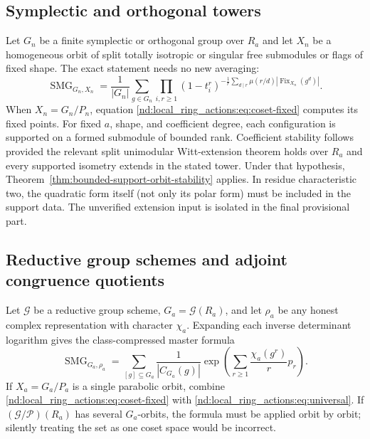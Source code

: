 \documentclass[10pt]{article}
\newcommand{\Fix}{\operatorname{Fix}}
\newcommand{\SMG}{\operatorname{SMG}}
\newcommand{\MGF}{\SMG}
\begin{document}
\clearpage
\subsection{Symplectic and orthogonal towers}
\thispagestyle{fancy}

Let $G_n$ be a finite symplectic or orthogonal group over $R_a$ and let $X_n$
be a homogeneous orbit of split totally isotropic or singular free submodules
or flags of fixed shape.  The exact statement needs no new averaging:
\begin{equation}\label{nd:local_ring_actions:eq:formed}
 \boxed{\MGF_{G_n,X_n}=\frac1{|G_n|}\sum_{g\in G_n}\prod_{i,r\ge1}
 (1-t_i^r)^{-\frac1r\sum_{d\mid r}\mu(r/d)|\Fix_{X_n}(g^d)|}.}
\end{equation}
When $X_n=G_n/P_n$, equation \eqref{nd:local_ring_actions:eq:coset-fixed} computes its fixed
points. For fixed $a$, shape, and coefficient degree, each configuration is
supported on a formed submodule of bounded rank. Coefficient stability follows
provided the relevant split unimodular Witt-extension theorem holds over
$R_a$ and every supported isometry extends in the stated tower. Under that
hypothesis, Theorem~\ref{thm:bounded-support-orbit-stability} applies. In
residue characteristic two, the quadratic form itself (not only its polar
form) must be included in the support data. The unverified extension input is
isolated in the final provisional part.

\subsection{Reductive group schemes and adjoint congruence quotients}

Let $\mathcal G$ be a reductive group scheme, $G_a=\mathcal G(R_a)$, and let
$\rho_a$ be any honest complex representation with character $\chi_a$.
Expanding each inverse determinant logarithm gives the class-compressed master
formula
\begin{equation}\label{nd:local_ring_actions:eq:character}
 \boxed{\MGF_{G_a,\rho_a}=\sum_{[g]\subseteq G_a}\frac1{|C_{G_a}(g)|}
 \exp\!\left(\sum_{r\ge1}\frac{\chi_a(g^r)}r p_r\right).}
\end{equation}
If $X_a=G_a/P_a$ is a single parabolic orbit, combine
\eqref{nd:local_ring_actions:eq:coset-fixed} with \eqref{nd:local_ring_actions:eq:universal}.  If
$(\mathcal G/\mathcal P)(R_a)$ has several $G_a$-orbits, the formula must be
applied orbit by orbit; silently treating the set as one coset space would be
incorrect.
\end{document}
